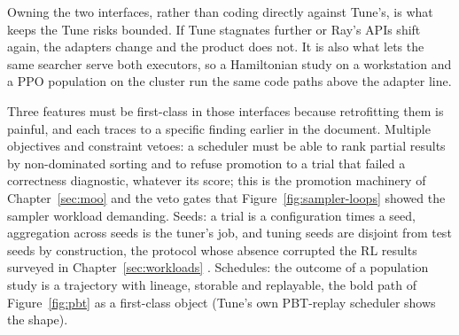 Owning the two interfaces, rather than coding directly against Tune's, is
what keeps the Tune risks bounded. If Tune stagnates further or Ray's
APIs shift again, the adapters change and the product does not. It is
also what lets the same searcher serve both executors, so a Hamiltonian
study on a workstation and a PPO population on the cluster run the same
code paths above the adapter line.

Three features must be first-class in those interfaces because
retrofitting them is painful, and each traces to a specific finding
earlier in the document. Multiple objectives and constraint vetoes: a
scheduler must be able to rank partial results by non-dominated sorting
and to refuse promotion to a trial that failed a correctness diagnostic,
whatever its score; this is the promotion machinery of
Chapter~\ref{sec:moo} and the veto gates that
Figure~\ref{fig:sampler-loops} showed the sampler workload demanding.
Seeds: a trial is a configuration times a seed, aggregation across seeds
is the tuner's job, and tuning seeds are disjoint from test seeds by
construction, the protocol whose absence corrupted the RL results
surveyed in Chapter~\ref{sec:workloads}
\citep{eimer2023hyperparameters}. Schedules: the outcome of a population
study is a trajectory with lineage, storable and replayable, the bold
path of Figure~\ref{fig:pbt} as a first-class object (Tune's own
PBT-replay scheduler shows the shape).

